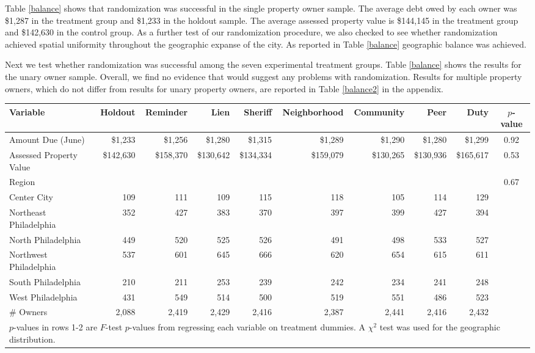 Table \ref{balance} shows that randomization was successful in the
single property owner sample.  The average debt owed by each owner was \$1,287
in the treatment group and \$1,233 in the holdout sample. The average
assessed property value is \$144,145 in the treatment group and
\$142,630 in the control group. As a further test of our randomization
procedure, we also checked to see whether randomization achieved
spatial uniformity throughout the geographic expanse of the city. As
reported in Table \ref{balance} geographic balance was achieved.

Next we test whether randomization was successful among the seven
experimental treatment groups. Table \ref{balance} shows the results
for the unary owner sample. Overall, we find no evidence that would
suggest any problems with randomization. Results for multiple property
owners, which do not differ from results for unary property owners,
are reported in Table \ref{balance2} in the appendix.

\begin{sidewaystable}[htbp]
\centering
\caption{Balance on Observables (Single Property Owners)}
\label{balance}
\vspace{10mm}
\begin{tabular}{lrrrrrrrrc}
\hline
  \hline
Variable & Holdout & Reminder & Lien & Sheriff & Neighborhood & Community & Peer & Duty & $p$-value \\ 
   \hline
Amount Due (June) & \$1,233 & \$1,256 & \$1,280 & \$1,315 & \$1,289 & \$1,290 & \$1,280 & \$1,299 & 0.92 \\ 
  Assessed Property Value & \$142,630 & \$158,370 & \$130,642 & \$134,334 & \$159,079 & \$130,265 & \$130,936 & \$165,617 & 0.53 \\ 
   \hline
  Region & & & & & & & & & 0.67 \\
  \enskip Center City & 109 & 111 & 109 & 115 & 118 & 105 & 114 & 129 & \\ 
  \enskip Northeast Philadelphia & 352 & 427 & 383 & 370 & 397 & 399 & 427 & 394 &  \\ 
  \enskip North Philadelphia & 449 & 520 & 525 & 526 & 491 & 498 & 533 & 527 &  \\ 
  \enskip Northwest Philadelphia & 537 & 601 & 645 & 666 & 620 & 654 & 615 & 611 &  \\ 
  \enskip South Philadelphia & 210 & 211 & 253 & 239 & 242 & 234 & 241 & 248 &  \\ 
  \enskip West Philadelphia & 431 & 549 & 514 & 500 & 519 & 551 & 486 & 523 &  \\ 
   \hline
\# Owners & 2,088 & 2,419 & 2,429 & 2,416 & 2,387 & 2,441 & 2,416 & 2,432 &  \\ 
  \hline

\multicolumn{10}{l}{\scriptsize{$p$-values in rows 1-2 are $F$-test
    $p$-values from regressing each variable on treatment dummies. A
    $\chi^2$ test was used for the geographic distribution.}} \\
\end{tabular}
\end{sidewaystable}
